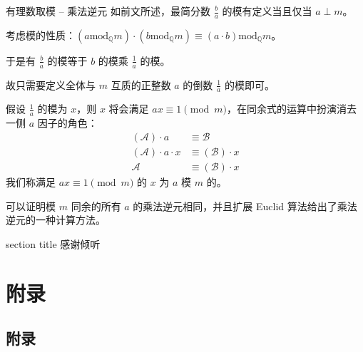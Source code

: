 \documentclass{../pkslide}
\begin{document}
\begin{frame}{有理数取模 -- 乘法逆元}
  如前文所述，最简分数 $\frac{b}{a}$ 的模有定义当且仅当 $a \perp m$。
  
  考虑模的性质：$(a \mathbin{\mathrm{mod}_{\mathbb Q}} m) \cdot (b \mathbin{\mathrm{mod}_{\mathbb Q}} m) \equiv (a \cdot b) \mathbin{\mathrm{mod}_{\mathbb Q}} m$。
  
  于是有 $\frac{b}{a}$ 的模等于 $b$ 的模乘 $\frac{1}{a}$ 的模。
  
  故只需要定义全体与 $m$ 互质的正整数 $a$ 的倒数 $\frac{1}{a}$ 的模即可。
  
  假设 $\frac{1}{a}$ 的模为 $x$，则 $x$ 将会满足 $a x \equiv 1 \pmod{m}$，在同余式的运算中扮演消去一侧 $a$ 因子的角色：%
  \begin{align*}
    (\mathcal A) \cdot a &\equiv \mathcal B \\
    (\mathcal A) \cdot a \cdot x &\equiv (\mathcal B) \cdot x \\
    \mathcal A &\equiv (\mathcal B) \cdot x
  \end{align*}%
  我们称满足 $a x \equiv 1 \pmod{m}$ 的 $x$ 为 $a$ 模 $m$ 的。
  
  可以证明模 $m$ 同余的所有 $a$ 的乘法逆元相同，并且扩展 Euclid 算法给出了乘法逆元的一种计算方法。
\end{frame}

\begin{frame}[c]
  \centering
  \begin{beamercolorbox}[sep = 12pt, center]{section title}
    感谢倾听\par
  \end{beamercolorbox}
\end{frame}


\section{附录}
\subsection*{附录}
\end{document}
